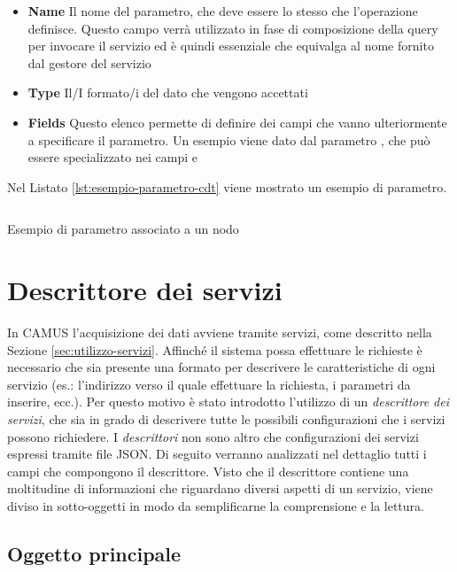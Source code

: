 \begin{itemize}
	\item \textbf{Name} Il nome del parametro, che deve essere lo stesso che l'operazione definisce. Questo campo verrà utilizzato in fase di composizione della query per invocare il servizio ed è quindi essenziale che equivalga al nome fornito dal gestore del servizio
	\item \textbf{Type} Il/I formato/i del dato che vengono accettati
	\item \textbf{Fields} Questo elenco permette di definire dei campi che vanno ulteriormente a specificare il parametro. Un esempio viene dato dal parametro , che può essere specializzato nei campi  e 
\end{itemize}

Nel Listato \ref{lst:esempio-parametro-cdt} viene mostrato un esempio di parametro.

\begin{listing}[H]
	\inputminted{json}{5-implementazione-backend/Codice/esempio_parametro_cdt.json}
	\caption{Esempio di parametro associato a un nodo}
	\label{lst:esempio-parametro-cdt}
\end{listing}

\section{Descrittore dei servizi\label{sec:descrittore-servizi}}

In CAMUS l'acquisizione dei dati avviene tramite servizi, come descritto nella Sezione \ref{sec:utilizzo-servizi}. Affinché il sistema possa effettuare le richieste è necessario che sia presente una formato per descrivere le caratteristiche di ogni servizio (es.: l'indirizzo verso il quale effettuare la richiesta, i parametri da inserire, ecc.). Per questo motivo è stato introdotto l'utilizzo di un \emph{descrittore dei servizi}, che sia in grado di descrivere tutte le possibili configurazioni che i servizi possono richiedere. I \emph{descrittori} non sono altro che configurazioni dei servizi espressi tramite file JSON. Di seguito verranno analizzati nel dettaglio tutti i campi che compongono il descrittore. Visto che il descrittore contiene una moltitudine di informazioni che riguardano diversi aspetti di un servizio, viene diviso in sotto-oggetti in modo da semplificarne la comprensione e la lettura.

\subsection{Oggetto principale\label{sec:oggetto-principale-servizi}}

